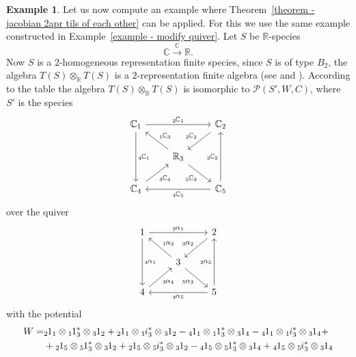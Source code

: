 \documentclass[a4paper, reqno]{amsart}
\theoremstyle{definition}
\newtheorem{myex}[mythm]{Example}
\newcommand\lsub[1]{{}_{#1}\hspace{-0.25mm}}
\newcommand{\C}{\mathbb{C}}
\newcommand{\R}{\mathbb{R}}
\begin{document}
\begin{myex}
	Let us now compute an example where Theorem~\ref{theorem - jacobian 2apr tils of each other} can be applied. For this we use the same example constructed in Example~\ref{example - modify quiver}. Let $S$ be $\R$-species
	\begin{equation*}
		\C \xrightarrow{\C} \R.
	\end{equation*}
	Now $S$ is a $2$-homogeneous representation finite species, since $S$ is of type $B_2$, the algebra $T(S)\otimes_\R T(S)$ is a $2$-representation finite algebra (see \cite[Corollary 3.7]{soderberg2022preprojective} and \cite[Corollary 1.5]{herschend2011n}). According to the table \cite[Table 1]{soderberg2024mutation} the algebra $T(S)\otimes_\R T(S)$ is isomorphic to $\mathcal{P}(S', W, C)$, where $S'$ is the species
	\begin{equation*}
		\begin{tikzcd}
			\C_1 \arrow[rr, "\lsub{2}\C_1"] \arrow[dd, "\lsub{4}\C_1"] & & \C_2 \arrow[dl, swap, "\lsub{3}\C_2"] \\
			& \R_3 \arrow[ul, swap, "\lsub{1}\C_3"] \arrow[dr, swap, "\lsub{5}\C_3"] \\
			\C_4 \arrow[ur, swap, "\lsub{3}\C_4"] & & \C_5 \arrow[ll, "\lsub{4}\C_5"] \arrow[uu, "\lsub{2}\C_5"]
		\end{tikzcd}
	\end{equation*}
	over the quiver
	\begin{equation*}
		\begin{tikzcd}
			1 \arrow[rr, "\lsub{2}\alpha_1"] \arrow[dd, "\lsub{4}\alpha_1"] & & 2 \arrow[dl, swap, "\lsub{3}\alpha_2"] \\
			& 3 \arrow[ul, swap, "\lsub{1}\alpha_3"] \arrow[dr, swap, "\lsub{5}\alpha_3"] \\
			4 \arrow[ur, swap, "\lsub{3}\alpha_4"] & & 5 \arrow[ll, "\lsub{4}\alpha_5"] \arrow[uu, "\lsub{2}\alpha_5"]
		\end{tikzcd}
	\end{equation*}
	with the potential
	\begin{equation*}
		\begin{aligned}
			W =& \lsub{2}1_1\otimes \lsub{1}1^*_3\otimes \lsub{3}1_2 + \lsub{2}1_1\otimes \lsub{1}i^*_3\otimes \lsub{3}1_2 - \lsub{4}1_1\otimes \lsub{1}1^*_3\otimes \lsub{3}1_4 - \lsub{4}1_1\otimes \lsub{1}i^*_3\otimes \lsub{3}1_4 + \\
			&+ \lsub{2}1_5\otimes \lsub{5}1^*_3\otimes \lsub{3}1_2 + \lsub{2}1_5\otimes \lsub{5}i^*_3\otimes \lsub{3}1_2 - \lsub{4}1_5\otimes \lsub{5}1^*_3\otimes \lsub{3}1_4 + \lsub{4}1_5\otimes \lsub{5}i^*_3\otimes \lsub{3}1_4

\end{aligned}
\end{equation*}
\end{myex}
\end{document}
